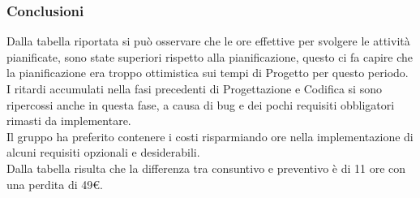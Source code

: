 \subsubsection{Conclusioni}

Dalla tabella riportata si può osservare che le ore effettive per svolgere le attività pianificate, sono state superiori rispetto alla pianificazione, questo ci fa capire che la pianificazione era troppo ottimistica sui tempi di Progetto per questo periodo.
I ritardi accumulati nella fasi precedenti di Progettazione e Codifica si sono ripercossi anche in questa fase, a causa di bug e dei pochi requisiti obbligatori rimasti da implementare.\\
Il gruppo ha preferito contenere i costi risparmiando ore nella implementazione di alcuni requisiti opzionali e desiderabili.\\
Dalla tabella risulta che la differenza tra consuntivo e preventivo è di 11 ore con una perdita di 49\euro.





